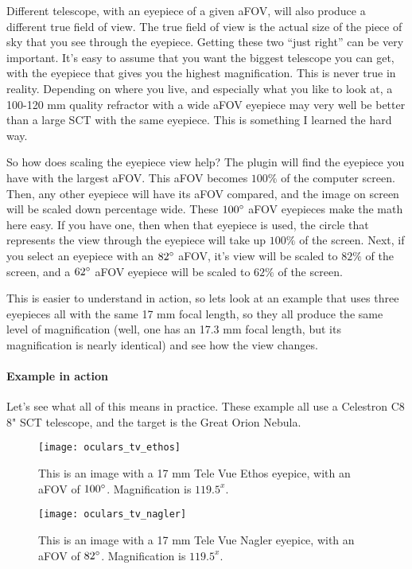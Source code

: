 Different telescope, with an eyepiece of a given aFOV, will also produce a different true field of view. The true field of view is the actual size of the piece of sky that you see through the eyepiece. Getting these two ``just right'' can be very important. It's easy to assume that you want the biggest telescope you can get, with the eyepiece that gives you the highest magnification. This is never true in reality. Depending on where you live, and especially what you like to look at, a 100-120 mm quality refractor with a wide aFOV eyepiece may very well be better than a large SCT with the same eyepiece. This is something I learned the hard way.

So how does scaling the eyepiece view help? The plugin will find the eyepiece you have with the largest aFOV. This aFOV becomes $100\%$ of the computer screen. Then, any other eyepiece will have its aFOV compared, and the image on screen will be scaled down percentage wide. These $100\degree$ aFOV eyepieces make the math here easy. If you have one, then when that eyepiece is used, the circle that represents the view through the eyepiece will take up $100\%$ of the screen. Next, if you select an eyepiece with an $82\degree$ aFOV, it's view will be scaled to $82\%$ of the screen, and a $62\degree$ aFOV eyepiece will be scaled to $62\%$ of the screen.

This is easier to understand in action, so lets look at an example that uses three eyepieces all with the same 17 mm focal length, so they all produce the same level of magnification (well, one has an 17.3 mm focal length, but its magnification is nearly identical) and see how the view changes.

\paragraph{Example in action}

Let's see what all of this means in practice. These example all use a Celestron C8 8" SCT telescope, and the target is the Great Orion Nebula.

\begin{figure}[ht]\centering
\texttt{[image: oculars\_tv\_ethos]}
\caption{This is an image with a 17 mm Tele Vue Ethos eyepice, with an aFOV of $100\degree$. Magnification is $119.5^x$.}
\label{fig:plugins:Oculars:TeleVue:Ethos}
\end{figure}

\begin{figure}[ht]\centering
\texttt{[image: oculars\_tv\_nagler]}
\caption{This is an image with a 17 mm Tele Vue Nagler eyepice, with an aFOV of $82\degree$. Magnification is $119.5^x$.}
\label{fig:plugins:Oculars:TeleVue:Nagler}
\end{figure}


